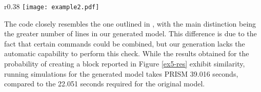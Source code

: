 \begin{comment}
   [NGRDF] (Network=0)  $\rightarrow$  
   	1 : (set2'=addBlockSet(set2,b2))$\&$(set3'=addBlockSet(set3,b3))$\&$(set4'=addBlockSet(set4,b4))$\&$(set5'=addBlockSet(set5,b5))$\&$(Network'=0); 
   [PCRLD] (Network=0)  $\rightarrow$  
   	1 : (set2'=addBlockSet(set2,b2))$\&$(set3'=addBlockSet(set3,b3))$\&$(set4'=addBlockSet(set4,b4))$\&$(set5'=addBlockSet(set5,b5))$\&$(Network'=0); 
   [MDDCF] (Network=0)  $\rightarrow$  1 : (set1' = removeBlock(set1,b1))$\&$(Network'=0); 
   [IQVPA] (Network=0)  $\rightarrow$  1 : (set1' = removeBlock(set1,b1))$\&$(Network'=0); 
   $\ldots$
endmodule

module Vote_Manager
   Vote_Manager : [0..1] init 0;
   epoch : [0..10] init 0;
   Votes : hash[];  
   tot_stake : [0..120000] init 50; 
   stake1 : [0..N] init 10; 
   stake2 : [0..N] init 10; 
   stake3 : [0..N] init 10; 
   stake4 : [0..N] init 10; 
   stake5 : [0..N] init 10; 

   [VSJBE] (Vote_Manager=0)  $\rightarrow$  
   	1 : (Votes'=addVote(Votes,b1,stake1))$\&$(Vote_Manager'=0); 
   $\ldots$
endmodule

\end{lstlisting}
\end{comment}

\begin{wrapfigure}{r}{0.38\textwidth}
	\vspace{-0.75cm}
	\centering
	\texttt{[image: example2.pdf]}	
	\vspace{-0.35cm}
	\caption{}
	\label{ex5-res}
	\vspace{-0.75cm}
	\end{wrapfigure}
        The code closely resembles the one outlined in
        \cite{DBLP:journals/distribledger/GallettaLMV23}, with the
        main distinction being the greater number of lines in our
        generated model.  This difference is due to the fact that
        certain commands could be combined, but our generation lacks
        the automatic capability to perform this check. While the
        results obtained for the probability of creating a block
        reported in Figure \ref{ex5-res} exhibit similarity, running
        simulations for the generated model takes PRISM 39.016
        seconds, compared to the 22.051 seconds required for the
        original model.



